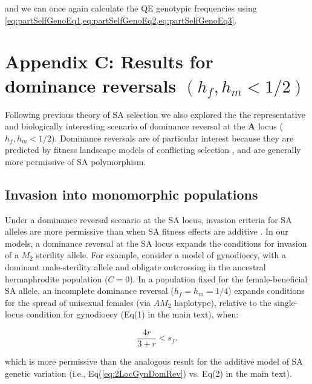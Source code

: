 \documentclass{article}
\begin{document}
\noindent and we can once again calculate the QE genotypic frequencies using \cref{eq:partSelfGenoEq1,eq:partSelfGenoEq2,eq:partSelfGenoEq3}.



\newpage{}
\section*{Appendix C: Results for dominance reversals $(h_f,h_m < 1/2)$}
\renewcommand{\theequation}{C\arabic{equation}}
\setcounter{equation}{0}
\renewcommand{\thefigure}{C\arabic{figure}}
\setcounter{figure}{0}

Following previous theory of SA selection we also explored the the representative and biologically interesting scenario of dominance reversal at the $\mathbf{A}$ locus ($h_f,h_m < 1/2$). Dominance reversals are of particular interest because they are predicted by fitness landscape models of conflicting selection \citep{Fry2010, ConnallonClark2014}, and are generally more permissive of SA polymorphism.



\subsection*{Invasion into monomorphic populations} 

Under a dominance reversal scenario at the SA locus, invasion criteria for SA alleles are more permissive than when SA fitness effects are additive \citep{Kidwell1977, ConnallonClark2012, JordanConnallon2014, Olito2016}. In our models, a dominance reversal at the SA locus expands the conditions for invasion of a $M_2$ sterility allele. For example, consider a model of gynodioecy, with a dominant male-sterility allele and obligate outcrossing in the ancestral hermaphrodite population ($C=0$). In a population fixed for the female-beneficial SA allele, an incomplete dominance reversal ($h_f=h_m=1/4$) expands conditions for the spread of unisexual females (via $AM_2$ haplotype), relative to the single-locus condition for gynodioecy (Eq(1) in the main text), when:

\begin{equation}\label{eq:2LocGynDomRev}
    \frac{4 r}{3 + r} < s_f.
\end{equation}

\noindent which is more permissive than the analogous result for the additive model of SA genetic variation (i.e., Eq(\ref{eq:2LocGynDomRev}) vs. Eq(2) in the main text).
\end{document}
